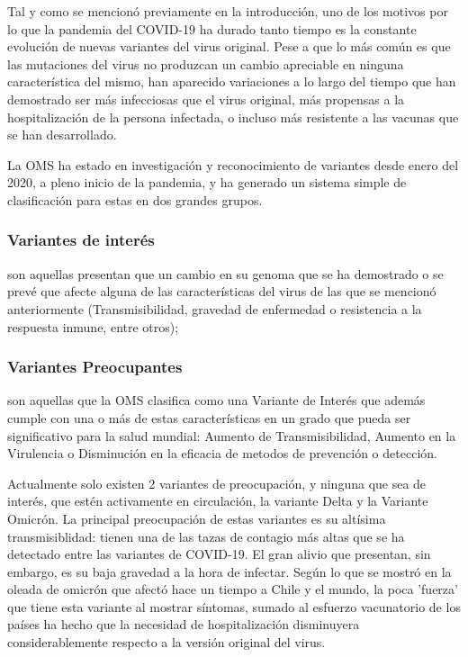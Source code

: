 Tal y como se mencionó previamente en la introducción, uno de los motivos por lo que la pandemia del COVID-19 ha durado tanto tiempo es la constante evolución de nuevas variantes del virus original. Pese a que lo más común es que las mutaciones del virus no produzcan un cambio apreciable en ninguna característica del mismo, han aparecido variaciones a lo largo del tiempo que han demostrado ser más infecciosas que el virus original, más propensas a la hospitalización de la persona infectada, o incluso más resistente a las vacunas que se han desarrollado.

La OMS ha estado en investigación y reconocimiento de variantes desde enero del 2020, a pleno inicio de la pandemia, y ha generado un sistema simple de clasificación para estas en dos grandes grupos. 

\subsubsection*{Variantes de interés} son aquellas presentan que un cambio en su genoma que se ha demostrado o se prevé que afecte alguna de las características del virus de las que se mencionó anteriormente (Transmisibilidad, gravedad de enfermedad o resistencia a la respuesta inmune, entre otros); 

\subsubsection*{Variantes Preocupantes} son aquellas que la OMS clasifica como una Variante de Interés que además cumple con una o más de estas características en un grado que pueda ser significativo para la salud mundial: Aumento de Transmisibilidad, Aumento en la Virulencia o Disminución en la eficacia de metodos de prevención o detección.\cite{oms}

Actualmente solo existen 2 variantes de preocupación, y ninguna que sea de interés, que estén activamente en circulación, la variante Delta y la Variante Omicrón. La principal preocupación de estas variantes es su altísima transmisiblidad: tienen una de las tazas de contagio más altas que se ha detectado entre las variantes de COVID-19. El gran alivio que presentan, sin embargo, es su baja gravedad a la hora de infectar. Según lo que se mostró en la oleada de omicrón que afectó hace un tiempo a Chile y el mundo, la poca 'fuerza' que tiene esta variante al mostrar síntomas, sumado al esfuerzo vacunatorio de los países ha hecho que la necesidad de hospitalización disminuyera considerablemente respecto a la versión original del virus.
